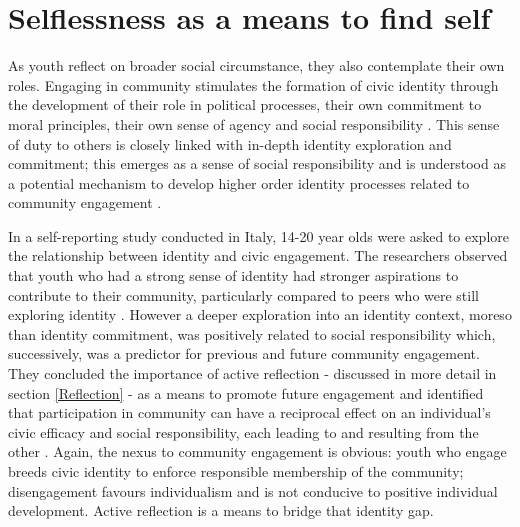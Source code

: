 \section{Selflessness as a means to find self}

As youth reflect on broader social circumstance, they also contemplate their own roles. Engaging in community stimulates the formation of civic identity through the development of their role in political processes, their own commitment to moral principles, their own sense of agency and social responsibility \citep{Youniss1997}. This sense of duty to others is closely linked with in-depth identity exploration and commitment; this emerges as a sense of social responsibility and is understood as a potential mechanism to develop higher order identity processes related to community engagement \citep{Crocetti2012}. 

In a self-reporting study conducted in Italy, 14-20 year olds were asked to explore the relationship between identity and civic engagement. The researchers observed that youth who had a strong sense of identity had stronger aspirations to contribute to their community, particularly compared to peers who were still exploring identity \citep{Crocetti2012}. However a deeper exploration into an identity context, moreso than identity commitment, was positively related to social responsibility which, successively, was a predictor for previous and future community engagement. They concluded the importance of active reflection - discussed in more detail in section \ref{Reflection} - as a means to promote future engagement and identified that participation in community can have a reciprocal effect on an individual's civic efficacy and social responsibility, each leading to and resulting from the other \citep{Crocetti2012}. Again, the nexus to community engagement is obvious: youth who engage breeds civic identity to enforce responsible membership of the community; disengagement favours individualism and is not conducive to positive individual development. Active reflection is a means to bridge that identity gap. 

